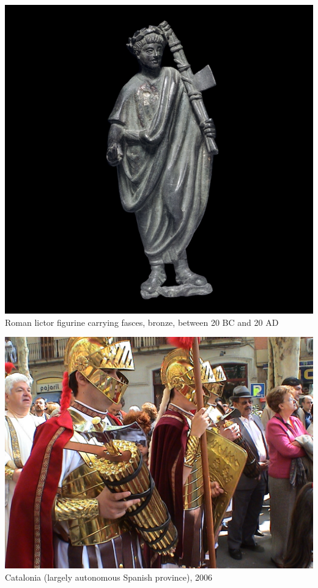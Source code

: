 \begin{frame}
    \centering
    \includegraphics[height=.8\textheight]{img/lictor.jpg} \\
    Roman lictor figurine carrying fasces, bronze, between 20 BC and 20 AD \\
\end{frame}

\begin{frame}
    \centering
    \includegraphics[width=.9\textwidth]{img/fasces/fake-fasces.jpg} \\
    Catalonia (largely autonomous Spanish province), 2006 \\
\end{frame}

